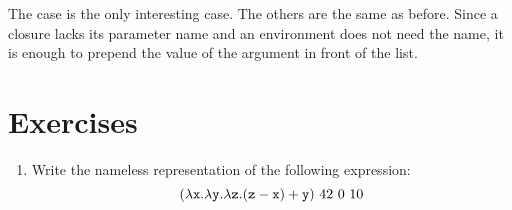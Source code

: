 The  case is the only interesting case. The others are the same as
before. Since a closure lacks its parameter name and an environment does not need
the name, it is enough to prepend the value of the argument in front of the list.

\section{Exercises}

\begin{enumerate}
\item Write the nameless representation of the following expression:
  \[
    (\lambda\texttt{x}.\lambda\texttt{y}.\lambda\texttt{z}.(\texttt{z}-\texttt{x})+\texttt{y})\ 42\ 0\ 10
  \]
\end{enumerate}
